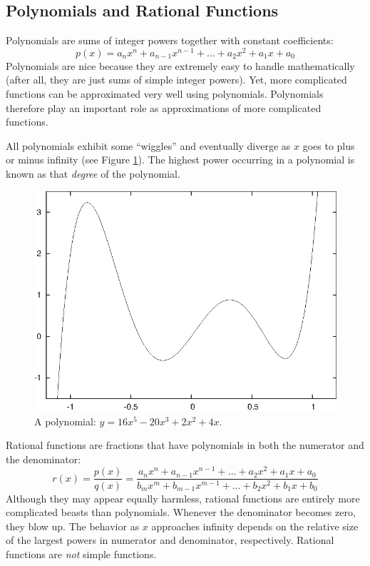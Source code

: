 \subsection{Polynomials and Rational Functions}


Polynomials are sums of integer powers together with constant
coefficients:\vspace*{-3pt}
%
\[
p(x) = a_n x^n + a_{n-1} x^{n-1} + \dots + a_2 x^2 + a_1 x + a_0
\]
%
Polynomials are nice because they are extremely easy to handle
mathematically (after all, they are just sums of simple integer
powers).  Yet, more complicated functions can be approximated very
well using polynomials. Polynomials therefore play an important role
as approximations of more complicated functions.

All polynomials exhibit some ``wiggles'' and eventually diverge as $x$
goes to plus or minus infinity (see Figure \ref{fig:polynomial}). The
highest power occurring in a polynomial is known as that \emph{degree}
of the\vadjust{\pagebreak} polynomial.

\begin{figure}
  \centerline{\includegraphics{img/polynomial}}
  \caption{A polynomial: $y = 16 x^5 - 20 x^3 + 2 x^2 + 4 x$.}
  \label{fig:polynomial}\vspace*{-9pt}
\end{figure} 

Rational functions are fractions that have polynomials in both the
numerator and the denominator:
%
\[
r(x) = \frac{p(x)}{q(x)} 
     = \frac{a_n x^n + a_{n-1} x^{n-1} + \dots + a_2 x^2 + a_1 x + a_0}
            {b_m x^m + b_{m-1} x^{m-1} + \dots + b_2 x^2 + b_1 x + b_0}
\]
%
Although they may appear equally harmless, rational functions are
entirely more complicated beasts than polynomials. Whenever the
denominator becomes zero, they blow up. The behavior as $x$ approaches
infinity depends on the relative size of the largest powers in
numerator and denominator, respectively. Rational functions are
\emph{not} simple functions.
    
